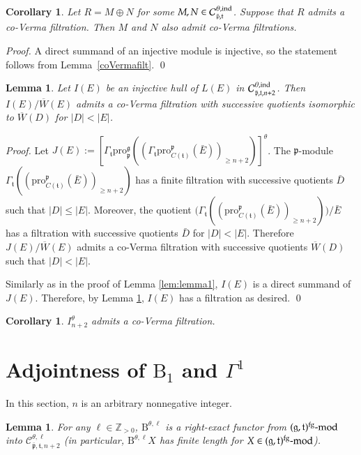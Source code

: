 \documentclass{tglat2e}
\newtheorem{lemma}[theorem]{Lemma}
\newtheorem{corollary}[theorem]{Corollary}
\theoremstyle{definition}
\theoremstyle{remark}
\renewcommand{\tt}{\mathfrak{t}}
\newcommand{\pp}{\mathfrak{p}}
\renewcommand{\gg}{\mathfrak{g}}
\newcommand{\pro}{\mathrm{pro}}
\begin{document}
\begin{corollary}\label{technical} Let $R=M\oplus N$ for some  $M,N\in\mathcal{C}^{\theta,\text{\rm ind}}_{\bar{\pp},\tt}$.
Suppose that $R$ admits a co-Verma filtration. Then $M$ and $N$ also admit  co-Verma 
filtrations.
\end{corollary}
\begin{proof} A direct summand of an injective module is injective, so the statement follows from Lemma~\ref{coVermafilt}.
\qed\end{proof}
	
	\begin{lemma} \label{lem:lemma2} Let $I(E)$ be an injective hull of $L(E)$ in $\mathcal{C}^{\theta,\text{\rm ind}}_{\bar{\pp},\tt,n+2}$.  
Then $I(E)/\overline{W}(E)$ admits a co-Verma filtration with successive quotients isomorphic to $\overline{W}(D)$ for $|D|<|E|$.
	\end{lemma}
        \begin{proof} Let
$J(E):=\left[\Gamma_\tt\pro^{\gg}_{\pp}\left(\left(\Gamma_\tt\pro^{\pp}_{C(\tt)}\left(\bar{E}\right)\right)_{\geq n+2}\right)\right]^\theta$.
The $\pp$-module $\Gamma_\tt\left(\left(\pro^{\pp}_{C(\tt)}(\bar E)\right)_{\geq n+2}\right)$ has a finite filtration with successive quotients $\bar{D}$ such that 
$|D|\leq |E|$. Moreover,
the quotient $\Biggr(\Gamma_\tt\left(\left(\pro^{\pp}_{C(\tt)}(\bar E)\right)_{\geq n+2}\right)\Biggl)/\bar{E}$ has a filtration with successive quotients $\bar{D}$ 
for $|D|<|E|$. Therefore
$J(E)/\overline{W}(E)$ admits a co-Verma filtration with successive quotients $\overline{W}(D)$ such that  $|D|<|E|$. 

Similarly as in the proof of Lemma \ref{lem:lemma1}, $I(E)$ is a direct summand of $J(E)$. Therefore, by Lemma \ref{technical}, 
$I(E)$ has a filtration as desired.
\qed\end{proof}

\begin{corollary}
$I^\theta_{n+2}$ admits a co-Verma filtration.
\end{corollary}
\section{Adjointness of $\mathrm{B}_1$ and $\Gamma^1$}
\label{sec:conjugacy}	

In this section, $n$ is an arbitrary nonnegative integer.

	\begin{lemma}
		For any $\ell\in\mathbb{Z}_{>0}$, $\mathrm{B}^{\theta,\ell}$ is a right-exact functor from $(\gg,\tt)^\text{\rm fg}\text{\rm-mod}$ into $\mathcal{C}^{\theta,\ell}_{\bar{\pp},\tt,n+2}$ (in particular, $\mathrm{B}^{\theta,\ell} X$ has finite length for $X\in (\gg,\tt)^\text{\rm fg}\text{\rm-mod}$).
		\label{lem:lemma3}
	\end{lemma}
	
\end{document}
